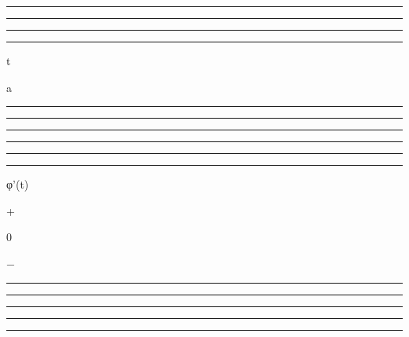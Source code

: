 \documentclass[]{article}
\begin{document}
\begin{center}\rule{3in}{0.4pt}\end{center}

\begin{center}\rule{3in}{0.4pt}\end{center}

\begin{center}\rule{3in}{0.4pt}\end{center}

\begin{center}\rule{3in}{0.4pt}\end{center}

t

a

\begin{center}\rule{3in}{0.4pt}\end{center}

\begin{center}\rule{3in}{0.4pt}\end{center}

\begin{center}\rule{3in}{0.4pt}\end{center}

\begin{center}\rule{3in}{0.4pt}\end{center}

\begin{center}\rule{3in}{0.4pt}\end{center}

\begin{center}\rule{3in}{0.4pt}\end{center}

φ'(t)

+

0

−

\begin{center}\rule{3in}{0.4pt}\end{center}

\begin{center}\rule{3in}{0.4pt}\end{center}

\begin{center}\rule{3in}{0.4pt}\end{center}

\begin{center}\rule{3in}{0.4pt}\end{center}

\begin{center}\rule{3in}{0.4pt}\end{center}
\end{document}
